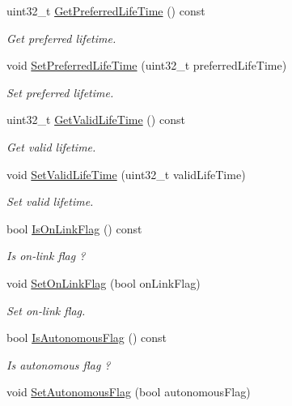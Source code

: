 \begin{DoxyCompactItemize}
uint32\+\_\+t \hyperlink{classns3_1_1RadvdPrefix_a80147da9676d74b42a1232b5c98a00f5}{Get\+Preferred\+Life\+Time} () const 
\begin{DoxyCompactList}\small\item\em Get preferred lifetime. \end{DoxyCompactList}\item 
void \hyperlink{classns3_1_1RadvdPrefix_a502a7b915cb138028f98d229981ffad7}{Set\+Preferred\+Life\+Time} (uint32\+\_\+t preferred\+Life\+Time)
\begin{DoxyCompactList}\small\item\em Set preferred lifetime. \end{DoxyCompactList}\item 
uint32\+\_\+t \hyperlink{classns3_1_1RadvdPrefix_a3a251d47037452be9275b99feddf383c}{Get\+Valid\+Life\+Time} () const 
\begin{DoxyCompactList}\small\item\em Get valid lifetime. \end{DoxyCompactList}\item 
void \hyperlink{classns3_1_1RadvdPrefix_a542b5619e6bce2258f5e7513749964c6}{Set\+Valid\+Life\+Time} (uint32\+\_\+t valid\+Life\+Time)
\begin{DoxyCompactList}\small\item\em Set valid lifetime. \end{DoxyCompactList}\item 
bool \hyperlink{classns3_1_1RadvdPrefix_ab79e17c3810077715cf5ba233af700da}{Is\+On\+Link\+Flag} () const 
\begin{DoxyCompactList}\small\item\em Is on-\/link flag ? \end{DoxyCompactList}\item 
void \hyperlink{classns3_1_1RadvdPrefix_a2289bca2c18719150e1758e8b4472f6f}{Set\+On\+Link\+Flag} (bool on\+Link\+Flag)
\begin{DoxyCompactList}\small\item\em Set on-\/link flag. \end{DoxyCompactList}\item 
bool \hyperlink{classns3_1_1RadvdPrefix_a50b52e0b462f101b17ca3454dedbde8e}{Is\+Autonomous\+Flag} () const 
\begin{DoxyCompactList}\small\item\em Is autonomous flag ? \end{DoxyCompactList}\item 
void \hyperlink{classns3_1_1RadvdPrefix_a10ade142339bdca1644723c766a47f0a}{Set\+Autonomous\+Flag} (bool autonomous\+Flag)

\end{DoxyCompactItemize}
